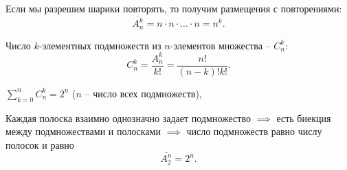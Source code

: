 \begin{remark}
  Если мы разрешим шарики повторять, то получим размещения с повторениями:
  \[
    \overline{A^{k}_{n}} = n \cdot n \cdot \ldots \cdot n = n^{k}.
  \]
\end{remark}

\begin{definition}
  Число $k$-элементных подмножеств из $n$-элементов множества -- $C^{k}_{n}$:
  \[
    C^{k}_{n} = \frac{A^{k}_{n}}{k!} = \frac{n!}{(n-k)!k!}.
  \]
\end{definition}

\begin{eg}
  $\sum_{k=0}^{n}C^{k}_{n} = 2^n$ ($n$ -- число всех подмножеств),
  \begin{figure}[H]
    \centering
    \label{fig:fig-3}
  \end{figure}

  Каждая полоска взаимно однозначно задает подмножество $\implies $ есть биекция между подмножествами и полосками $\implies $ число подмножеств равно числу полосок и равно
  \[
    \overline{A_{2}^{n}} = 2^n.
  \]
\end{eg}

